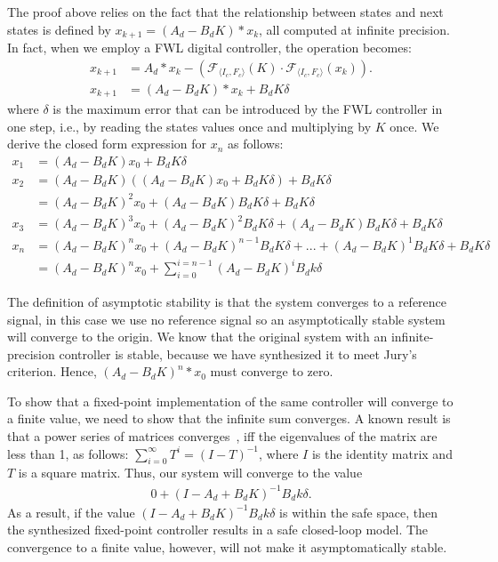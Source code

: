 \documentclass[runningheads,a4paper]{llncs}
\begin{document}
The proof above relies on the fact that the relationship between states and next states is defined by
$x_{k+1} = (A_d  - B_dK)*x_k$, all computed at infinite precision. In fact, when we employ a FWL digital controller, 
the operation becomes:
\begin{align*}
x_{k+1} &= A_d * x_{k} -(\mathcal{F}_{\langle I_c,F_c \rangle}(K)\cdot\mathcal{F}_{\langle I_c,F_c \rangle}(x_{k})).  \\
x_{k+1} &= (A_d  - B_dK)*x_k + B_dK\delta
\end{align*}
where $\delta$ is the maximum error that can be introduced by the FWL controller in one step, i.e., by reading the states values once and multiplying by $K$ once. 
We derive the closed form expression for $x_n$ as follows: 
\begin{align*}
x_{1} &= (A_d  - B_dK)x_0 + B_dK\delta \\
x_{2} &= (A_d  - B_dK)((A_d  - B_dK)x_0 + B_dK\delta ) + B_dK\delta \\
      &=(A_d  - B_dK)^2x_0 + (A_d  - B_dK)B_dK\delta + B_dK\delta \\
x_{3}  &=(A_d  - B_dK)^3x_0 + (A_d  - B_dK)^2B_dK\delta + (A_d  - B_dK)B_dK\delta + B_dK\delta\\
x_{n} &= (A_d  - B_dK)^nx_0 + (A_d  - B_dK)^{n-1}B_dK\delta + ... + (A_d  - B_dK)^1B_dK \delta + B_dK\delta \\
  &= (A_d - B_dK)^nx_0 + \sum_{i=0}^{i=n-1}(A_d - B_dK)^iB_dk\delta
\end{align*}

The definition of asymptotic stability is that the system converges to a reference signal, in this case we use no
reference signal so an asymptotically stable system will converge to the origin. We know that the original system
with an infinite-precision controller is stable, because we have synthesized it to meet Jury's criterion. Hence, 
$(A_d  - B_dK)^n*x_0$ must converge to zero. 

To show that a fixed-point implementation of the same controller will converge to a finite value, 
we need to show that the infinite sum converges.
A known result is that a power series of matrices converges~\cite{horn1990matrix}, iff the eigenvalues of the matrix are less than 1, as follows:
$\sum_{i=0}^{\infty}T^i  = (I - T)^{-1}$, 
where $I$ is the identity matrix and $T$ is a square matrix. Thus, our system will converge to the value 
\begin{align*}
0 + (I - A_d + B_dK)^{-1}B_dk\delta. 
\end{align*}
As a result, if the value $(I - A_d + B_dK)^{-1}B_dk\delta$ is within the safe space, then the synthesized fixed-point controller results in a safe closed-loop model. 
The convergence to a finite value, however, will not make it asymptomatically stable.
\end{document}
